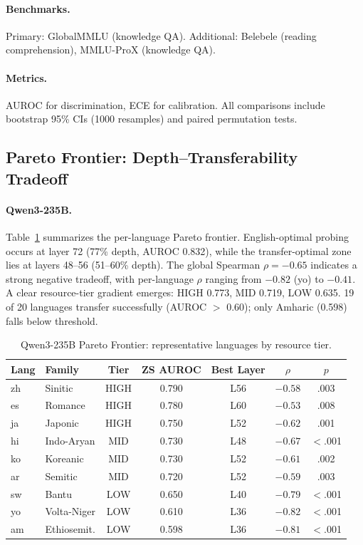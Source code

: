 \documentclass[11pt,a4paper]{article}
\begin{document}
\paragraph{Benchmarks.}
Primary: GlobalMMLU (knowledge QA).
Additional: Belebele (reading comprehension), MMLU-ProX (knowledge QA).

\paragraph{Metrics.}
AUROC for discrimination, ECE for calibration.
All comparisons include bootstrap 95\% CIs (1000 resamples) and paired permutation tests.

\subsection{Pareto Frontier: Depth--Transferability Tradeoff}
\label{sec:pareto}

\paragraph{Qwen3-235B.}
Table~\ref{tab:qwen_pareto} summarizes the per-language Pareto frontier.
English-optimal probing occurs at layer 72 (77\% depth, AUROC 0.832), while the transfer-optimal zone lies at layers 48--56 (51--60\% depth).
The global Spearman $\rho = -0.65$ indicates a strong negative tradeoff, with per-language $\rho$ ranging from $-0.82$ (yo) to $-0.41$.
A clear resource-tier gradient emerges: HIGH 0.773, MID 0.719, LOW 0.635.
19 of 20 languages transfer successfully (AUROC $>$ 0.60); only Amharic (0.598) falls below threshold.

\begin{table}[t]
\centering
\caption{Qwen3-235B Pareto Frontier: representative languages by resource tier.}
\label{tab:qwen_pareto}
\small
\begin{tabular}{llccccc}
\toprule
\textbf{Lang} & \textbf{Family} & \textbf{Tier} & \textbf{ZS AUROC} & \textbf{Best Layer} & \textbf{$\rho$} & \textbf{$p$} \\
\midrule
zh & Sinitic    & HIGH & 0.790 & L56 & $-0.58$ & .003 \\
es & Romance    & HIGH & 0.780 & L60 & $-0.53$ & .008 \\
ja & Japonic    & HIGH & 0.750 & L52 & $-0.62$ & .001 \\
hi & Indo-Aryan & MID  & 0.730 & L48 & $-0.67$ & $<$.001 \\
ko & Koreanic   & MID  & 0.730 & L52 & $-0.61$ & .002 \\
ar & Semitic    & MID  & 0.720 & L52 & $-0.59$ & .003 \\
sw & Bantu      & LOW  & 0.650 & L40 & $-0.79$ & $<$.001 \\
yo & Volta-Niger& LOW  & 0.610 & L36 & $-0.82$ & $<$.001 \\
am & Ethiosemit.& LOW  & 0.598 & L36 & $-0.81$ & $<$.001 \\
\bottomrule
\end{tabular}
\end{table}
\end{document}
